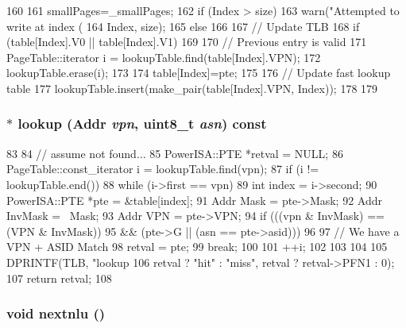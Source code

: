 \begin{DoxyCode}
160 {
161     smallPages=_smallPages;
162     if (Index > size){
163         warn("Attempted to write at index (%
164              Index, size);
165     } else {
166 
167         // Update TLB
168         if (table[Index].V0 || table[Index].V1) {
169 
170             // Previous entry is valid
171             PageTable::iterator i = lookupTable.find(table[Index].VPN);
172             lookupTable.erase(i);
173         }
174         table[Index]=pte;
175 
176         // Update fast lookup table
177         lookupTable.insert(make_pair(table[Index].VPN, Index));
178     }
179 }
\end{DoxyCode}
\hypertarget{classPowerISA_1_1TLB_aa6743f978416251dd93c6dc9ff1d5e82}{
\subsubsection[{lookup}]{ $\ast$ lookup ({\bf Addr} {\em vpn}, \/  uint8\_\-t {\em asn}) const}}
\label{classPowerISA_1_1TLB_aa6743f978416251dd93c6dc9ff1d5e82}



\begin{DoxyCode}
83 {
84     // assume not found...
85     PowerISA::PTE *retval = NULL;
86     PageTable::const_iterator i = lookupTable.find(vpn);
87     if (i != lookupTable.end()) {
88         while (i->first == vpn) {
89             int index = i->second;
90             PowerISA::PTE *pte = &table[index];
91             Addr Mask = pte->Mask;
92             Addr InvMask = ~Mask;
93             Addr VPN  = pte->VPN;
94             if (((vpn & InvMask) == (VPN & InvMask))
95                && (pte->G  || (asn == pte->asid))) {
96 
97                 // We have a VPN + ASID Match
98                 retval = pte;
99                 break;
100             }
101             ++i;
102         }
103     }
104 
105     DPRINTF(TLB, "lookup %
106             retval ? "hit" : "miss", retval ? retval->PFN1 : 0);
107     return retval;
108 }
\end{DoxyCode}
\hypertarget{classPowerISA_1_1TLB_aeb5ba263cf2621ed26767046ab78a1dc}{
\subsubsection[{nextnlu}]{\setlength{\rightskip}{0pt plus 5cm}void nextnlu ()}}
\label{classPowerISA_1_1TLB_aeb5ba263cf2621ed26767046ab78a1dc}



